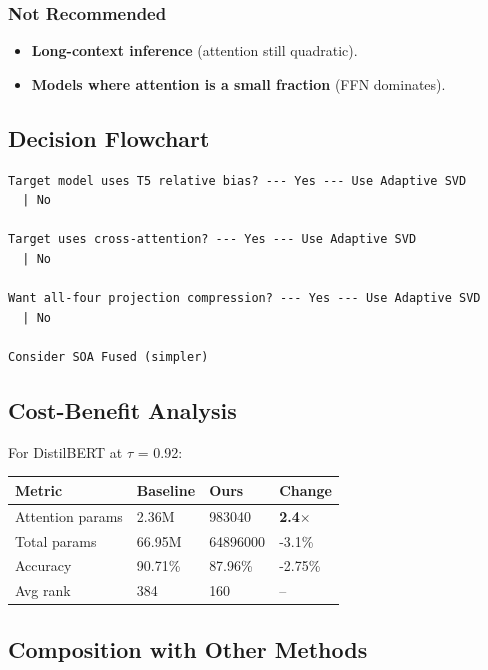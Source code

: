 \subsubsection{Not Recommended}
\begin{itemize}
\item \textbf{Long-context inference} (attention still quadratic).
\item \textbf{Models where attention is a small fraction} (FFN dominates).

\end{itemize}
\subsection{Decision Flowchart}

\begin{lstlisting}
Target model uses T5 relative bias? --- Yes --- Use Adaptive SVD
  | No
   
Target uses cross-attention? --- Yes --- Use Adaptive SVD
  | No
   
Want all-four projection compression? --- Yes --- Use Adaptive SVD
  | No
   
Consider SOA Fused (simpler)
\end{lstlisting}

\subsection{Cost-Benefit Analysis}

For DistilBERT at $\tau$ = 0.92:

\begin{table}[H]
\centering
\small
\begin{tabular}{llll}
\toprule
\textbf{Metric} & \textbf{Baseline} & \textbf{Ours} & \textbf{Change} \\
\midrule
Attention params & 2.36M & 983040 & \textbf{2.4$\times$} \\
Total params & 66.95M & 64896000 & -3.1\% \\
Accuracy & 90.71\% & 87.96\% & -2.75\% \\
Avg rank & 384 & 160 & -- \\
\bottomrule
\end{tabular}
\end{table}

\subsection{Composition with Other Methods}

